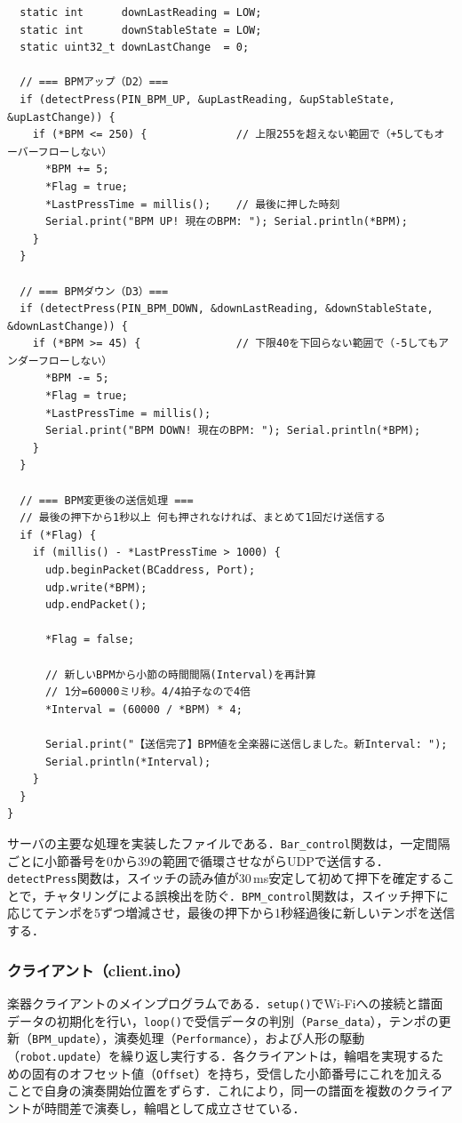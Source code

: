 \begin{lstlisting}
  static int      downLastReading = LOW;
  static int      downStableState = LOW;
  static uint32_t downLastChange  = 0;

  // === BPMアップ（D2）===
  if (detectPress(PIN_BPM_UP, &upLastReading, &upStableState, &upLastChange)) {
    if (*BPM <= 250) {              // 上限255を超えない範囲で（+5してもオーバーフローしない）
      *BPM += 5;
      *Flag = true;
      *LastPressTime = millis();    // 最後に押した時刻
      Serial.print("BPM UP! 現在のBPM: "); Serial.println(*BPM);
    }
  }

  // === BPMダウン（D3）===
  if (detectPress(PIN_BPM_DOWN, &downLastReading, &downStableState, &downLastChange)) {
    if (*BPM >= 45) {               // 下限40を下回らない範囲で（-5してもアンダーフローしない）
      *BPM -= 5;
      *Flag = true;
      *LastPressTime = millis();
      Serial.print("BPM DOWN! 現在のBPM: "); Serial.println(*BPM);
    }
  }

  // === BPM変更後の送信処理 ===
  // 最後の押下から1秒以上 何も押されなければ、まとめて1回だけ送信する
  if (*Flag) {
    if (millis() - *LastPressTime > 1000) {
      udp.beginPacket(BCaddress, Port);
      udp.write(*BPM);
      udp.endPacket();
      
      *Flag = false;
      
      // 新しいBPMから小節の時間間隔(Interval)を再計算
      // 1分=60000ミリ秒。4/4拍子なので4倍
      *Interval = (60000 / *BPM) * 4; 
      
      Serial.print("【送信完了】BPM値を全楽器に送信しました。新Interval: ");
      Serial.println(*Interval);
    }
  }
}

\end{lstlisting}
サーバの主要な処理を実装したファイルである．\texttt{Bar\_control}関数は，一定間隔ごとに小節番号を0から39の範囲で循環させながらUDPで送信する．\texttt{detectPress}関数は，スイッチの読み値が30\,ms安定して初めて押下を確定することで，チャタリングによる誤検出を防ぐ．\texttt{BPM\_control}関数は，スイッチ押下に応じてテンポを5ずつ増減させ，最後の押下から1秒経過後に新しいテンポを送信する．

\subsubsection{クライアント（client.ino）}
楽器クライアントのメインプログラムである．\texttt{setup()}でWi-Fiへの接続と譜面データの初期化を行い，\texttt{loop()}で受信データの判別（\texttt{Parse\_data}），テンポの更新（\texttt{BPM\_update}），演奏処理（\texttt{Performance}），および人形の駆動（\texttt{robot.update}）を繰り返し実行する．各クライアントは，輪唱を実現するための固有のオフセット値（\texttt{Offset}）を持ち，受信した小節番号にこれを加えることで自身の演奏開始位置をずらす．これにより，同一の譜面を複数のクライアントが時間差で演奏し，輪唱として成立させている．


